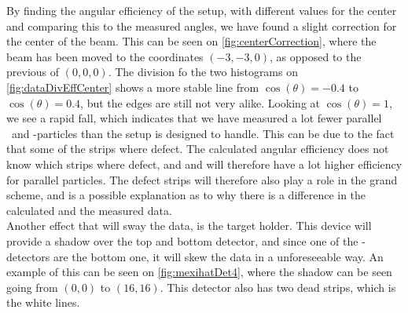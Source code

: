By finding the angular efficiency of the setup, with different values for the center and comparing this to the measured angles, we have found a slight correction for the center of the beam. This can be seen on \cref{fig:centerCorrection}, where the beam has been moved to the coordinates $(-3, -3, 0)$, as opposed to the previous of $(0, 0, 0)$. The division fo the two histograms on \cref{fig:dataDivEffCenter} shows a more stable line from $\cos(\theta)= -0.4$ to $\cos(\theta) = 0.4$, but the edges are still not very alike. Looking at $\cos(\theta) = 1$, we see a rapid fall, which indicates that we have measured a lot fewer parallel \be\ and \al-particles than the setup is designed to handle. 
This can be due to the fact that some of the strips where defect. The calculated angular efficiency does not know which strips where defect, and and will therefore have a lot higher efficiency for parallel particles. The defect strips will therefore also play a role in the grand scheme, and is a possible explanation as to why there is a difference in the calculated and the measured data. \\
Another effect that will sway the data, is the target holder. This device will provide a shadow over the top and bottom detector, and since one of the \be-detectors are the bottom one, it will skew the data in a unforeseeable way. An example of this can be seen on \ref{fig:mexihatDet4}, where the shadow can be seen going from $(0,0)$ to $(16,16)$. This detector also has two dead strips, which is the white lines.  
